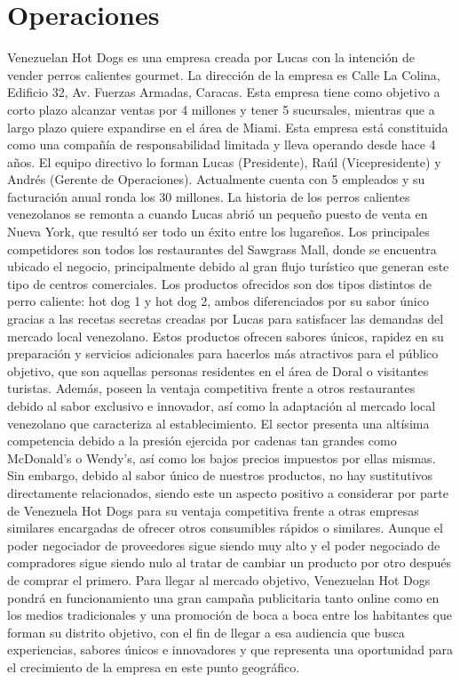 \section{Operaciones} \label{sec:operaciones}Venezuelan Hot Dogs es una empresa creada por Lucas con la intención de vender perros calientes gourmet. La dirección de la empresa es Calle La Colina, Edificio 32, Av. Fuerzas Armadas, Caracas. Esta empresa tiene como objetivo a corto plazo alcanzar ventas por 4 millones y tener 5 sucursales, mientras que a largo plazo quiere expandirse en el área de Miami. Esta empresa está constituida como una compañía de responsabilidad limitada y lleva operando desde hace 4 años. El equipo directivo lo forman Lucas (Presidente), Raúl (Vicepresidente) y Andrés (Gerente de Operaciones). Actualmente cuenta con 5 empleados y su facturación anual ronda los 30 millones.
La historia de los perros calientes venezolanos se remonta a cuando Lucas abrió un pequeño puesto de venta en Nueva York, que resultó ser todo un éxito entre los lugareños. Los principales competidores son todos los restaurantes del Sawgrass Mall, donde se encuentra ubicado el negocio, principalmente debido al gran flujo turístico que generan este tipo de centros comerciales.
Los productos ofrecidos son dos tipos distintos de perro caliente: hot dog 1 y hot dog 2, ambos diferenciados por su sabor único gracias a las recetas secretas creadas por Lucas para satisfacer las demandas del mercado local venezolano. Estos productos ofrecen sabores únicos, rapidez en su preparación y servicios adicionales para hacerlos más atractivos para el público objetivo, que son aquellas personas residentes en el área de Doral o visitantes turistas. Además, poseen la ventaja competitiva frente a otros restaurantes debido al sabor exclusivo e innovador, así como la adaptación al mercado local venezolano que caracteriza al establecimiento.
El sector presenta una altísima competencia debido a la presión ejercida por cadenas tan grandes como McDonald's o Wendy's, así como los bajos precios impuestos por ellas mismas. Sin embargo, debido al sabor único de nuestros productos, no hay sustitutivos directamente relacionados, siendo este un aspecto positivo a considerar por parte de Venezuela Hot Dogs para su ventaja competitiva frente a otras empresas similares encargadas de ofrecer otros consumibles rápidos o similares. Aunque el poder negociador de proveedores sigue siendo muy alto y el poder negociado de compradores sigue siendo nulo al tratar de cambiar un producto por otro después de comprar el primero.
Para llegar al mercado objetivo, Venezuelan Hot Dogs pondrá en funcionamiento una gran campaña publicitaria tanto online como en los medios tradicionales y una promoción de boca a boca entre los habitantes que forman su distrito objetivo, con el fin de llegar a esa audiencia que busca experiencias, sabores únicos e innovadores y que representa una oportunidad para el crecimiento de la empresa en este punto geográfico.
